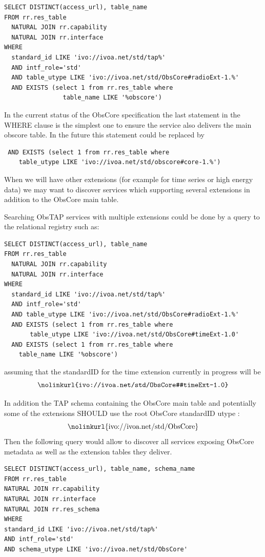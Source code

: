 \documentclass[11pt,a4paper]{ivoa}
\begin{document}
\begin{lstlisting}
SELECT DISTINCT(access_url), table_name
FROM rr.res_table
  NATURAL JOIN rr.capability
  NATURAL JOIN rr.interface
WHERE
  standard_id LIKE 'ivo://ivoa.net/std/tap%'
  AND intf_role='std'
  AND table_utype LIKE 'ivo://ivoa.net/std/ObsCore#radioExt-1.%'
  AND EXISTS (select 1 from rr.res_table where
    			table_name LIKE '%obscore')
\end{lstlisting}

In the current status of the ObsCore specification the last statement in the WHERE clause
is the simplest one to ensure the service also delivers the main obscore table. 
In the future  this statement could be replaced   by 
\begin{lstlisting}
 AND EXISTS (select 1 from rr.res_table where
    table_utype LIKE 'ivo://ivoa.net/std/obscore#core-1.%')
\end{lstlisting}
 
When we will have other extensions (for example for time series or high energy data) we may want to 
discover services which supporting  several extensions in addition to the ObsCore 
main table.

Searching ObsTAP services with multiple extensions could be done by a query to the relational registry  such as:  

\begin{lstlisting}
SELECT DISTINCT(access_url), table_name
FROM rr.res_table
  NATURAL JOIN rr.capability
  NATURAL JOIN rr.interface
WHERE
  standard_id LIKE 'ivo://ivoa.net/std/tap%'
  AND intf_role='std'
  AND table_utype LIKE 'ivo://ivoa.net/std/ObsCore#radioExt-1.%'
  AND EXISTS (select 1 from rr.res_table where 
       table_utype LIKE 'ivo://ivoa.net/std/ObsCore#timeExt-1.0'
  AND EXISTS (select 1 from rr.res_table where
    table_name LIKE '%obscore')
\end{lstlisting}

assuming that the standardID for the time extension currently in progress will be 
$$
\hbox{\nolinkurl{ivo://ivoa.net/std/ObsCore#timeExt-1.0}}
$$

In addition the TAP schema containing the ObsCore main table and potentially some of the  extensions
SHOULD use the root ObsCore standardID utype :
$$
\hbox{\nolinkurl{ivo://ivoa.net/std/ObsCore}}
$$
Then the following query would allow to discover all services exposing ObsCore metadata as well as  the extension tables they deliver.

\begin{lstlisting}
SELECT DISTINCT(access_url), table_name, schema_name
FROM rr.res_table
NATURAL JOIN rr.capability
NATURAL JOIN rr.interface
NATURAL JOIN rr.res_schema
WHERE
standard_id LIKE 'ivo://ivoa.net/std/tap%'
AND intf_role='std'
AND schema_utype LIKE 'ivo://ivoa.net/std/ObsCore'
\end{lstlisting}

\newpage
\appendix





\end{document}
